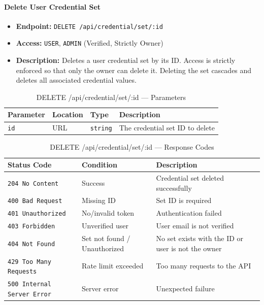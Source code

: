 \paragraph{Delete User Credential Set}
\label{subsubsec:delete-user-credential-set}

\begin{itemize}
  \item \textbf{Endpoint:} \texttt{DELETE /api/credential/set/:id}
  \item \textbf{Access:} \texttt{USER}, \texttt{ADMIN} (Verified, Strictly Owner)
  \item \textbf{Description:} Deletes a user credential set by its ID.
  Access is strictly enforced so that only the owner can delete it.
  Deleting the set cascades and deletes all associated credential values.
\end{itemize}

\begin{table}[H]
\centering
\renewcommand{\arraystretch}{1.3}
\begin{tabularx}{\textwidth}{|l|l|l|X|}
\hline
\textbf{Parameter} & \textbf{Location} & \textbf{Type} & \textbf{Description} \\
\hline
\texttt{id} & URL & \texttt{string} & The credential set ID to delete \\
\hline
\end{tabularx}
\caption{DELETE /api/credential/set/:id — Parameters}
\label{tab:delete-user-credential-set-params}
\end{table}

\begin{table}[H]
\centering
\renewcommand{\arraystretch}{1.3}
\begin{tabularx}{\textwidth}{|l|l|X|}
\hline
\textbf{Status Code} & \textbf{Condition} & \textbf{Description} \\
\hline
\texttt{204 No Content}   & Success              & Credential set deleted successfully \\
\hline
\texttt{400 Bad Request}  & Missing ID           & Set ID is required \\
\hline
\texttt{401 Unauthorized} & No/invalid token     & Authentication failed \\
\hline
\texttt{403 Forbidden}    & Unverified user      & User email is not verified \\
\hline
\texttt{404 Not Found}    & Set not found / Unauthorized & No set exists with the ID or user is not the owner \\
\hline
\texttt{429 Too Many Requests} & Rate limit exceeded & Too many requests to the API \\
\hline
\texttt{500 Internal Server Error} & Server error & Unexpected failure \\
\hline
\end{tabularx}
\caption{DELETE /api/credential/set/:id — Response Codes}
\label{tab:delete-user-credential-set-responses}
\end{table}
\FloatBarrier
